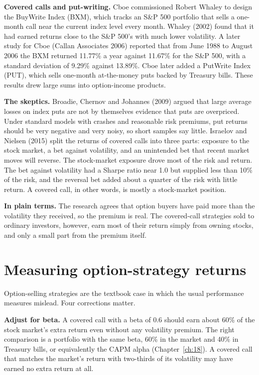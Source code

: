 \textbf{Covered calls and put-writing.} Cboe commissioned Robert Whaley to design the BuyWrite Index (BXM), which tracks an S\&P 500 portfolio that sells a one-month call near the current index level every month. Whaley (2002) found that it had earned returns close to the S\&P 500's with much lower volatility. A later study for Cboe (Callan Associates 2006) reported that from June 1988 to August 2006 the BXM returned 11.77\% a year against 11.67\% for the S\&P 500, with a standard deviation of 9.29\% against 13.89\%. Cboe later added a PutWrite Index (PUT), which sells one-month at-the-money puts backed by Treasury bills. These results drew large sums into option-income products.

\textbf{The skeptics.} Broadie, Chernov and Johannes (2009) argued that large average losses on index puts are not by themselves evidence that puts are overpriced. Under standard models with crashes and reasonable risk premiums, put returns should be very negative and very noisy, so short samples say little. Israelov and Nielsen (2015) split the returns of covered calls into three parts: exposure to the stock market, a bet against volatility, and an unintended bet that recent market moves will reverse. The stock-market exposure drove most of the risk and return. The bet against volatility had a Sharpe ratio near 1.0 but supplied less than 10\% of the risk, and the reversal bet added about a quarter of the risk with little return. A covered call, in other words, is mostly a stock-market position.

\noindent\textbf{In plain terms.} The research agrees that option buyers have paid more than the volatility they received, so the premium is real. The covered-call strategies sold to ordinary investors, however, earn most of their return simply from owning stocks, and only a small part from the premium itself.

\section{Measuring option-strategy returns}
\label{sec:16-measure}

Option-selling strategies are the textbook case in which the usual performance measures mislead. Four corrections matter.

\textbf{Adjust for beta.} A covered call with a beta of 0.6 should earn about 60\% of the stock market's extra return even without any volatility premium. The right comparison is a portfolio with the same beta, 60\% in the market and 40\% in Treasury bills, or equivalently the CAPM alpha (Chapter~\ref{ch:18}). A covered call that matches the market's return with two-thirds of its volatility may have earned no extra return at all.

